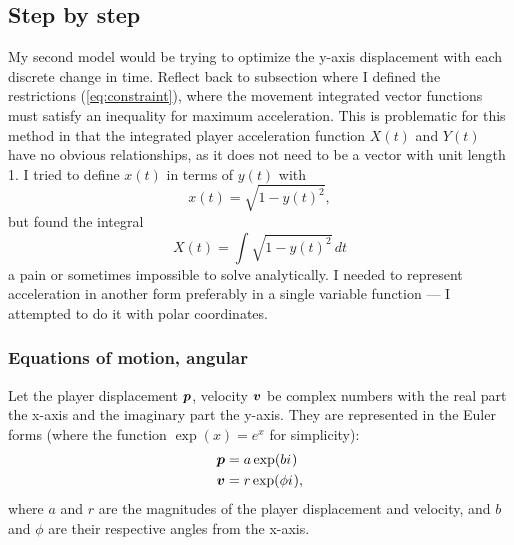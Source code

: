 \subsection{Step by step}
My second model would be trying to optimize the y-axis displacement with each discrete change in time. Reflect back to subsection where I defined the restrictions (\ref{eq:constraint}), where the movement integrated vector functions must satisfy an inequality for maximum acceleration. This is problematic for this method in that the integrated player acceleration function $X(t)$ and $Y(t)$ have no obvious relationships, as it does not need to be a vector with unit length 1. I tried to define $x(t)$ in terms of $y(t)$ with
\[
    x(t) = \sqrt{1-y(t)^2},
\]
but found the integral
\[
    X(t) = \int \sqrt{1-y(t)^2} \, dt
\]
a pain or sometimes impossible to solve analytically. I needed to represent acceleration in another form preferably in a single variable function --- I attempted to do it with polar coordinates.





\subsubsection{Equations of motion, angular}
Let the player displacement $\boldsymbol{p}$, velocity $\boldsymbol{v}$ be complex numbers with the real part the x-axis and the imaginary part the y-axis. They are represented in the Euler forms (where the function $\exp(x)= e^{x}$ for simplicity):
\begin{align*}
    \boldsymbol{p} &= a \exp(b {i\mkern1mu})\\
    \boldsymbol{v} &= r \exp(\phi {i\mkern1mu}),
\end{align*}
where $a$ and $r$ are the magnitudes of the player displacement and velocity, and $b$ and $\phi$ are their respective angles from the x-axis.

